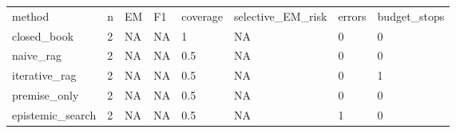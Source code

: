 \begin{tabular}{llllllll}
\hline
method & n & EM & F1 & coverage & selective\_EM\_risk & errors & budget\_stops \\
closed\_book & 2 & NA & NA & 1 & NA & 0 & 0 \\
naive\_rag & 2 & NA & NA & 0.5 & NA & 0 & 0 \\
iterative\_rag & 2 & NA & NA & 0.5 & NA & 0 & 1 \\
premise\_only & 2 & NA & NA & 0.5 & NA & 0 & 0 \\
epistemic\_search & 2 & NA & NA & 0.5 & NA & 1 & 0 \\
\hline
\end{tabular}
